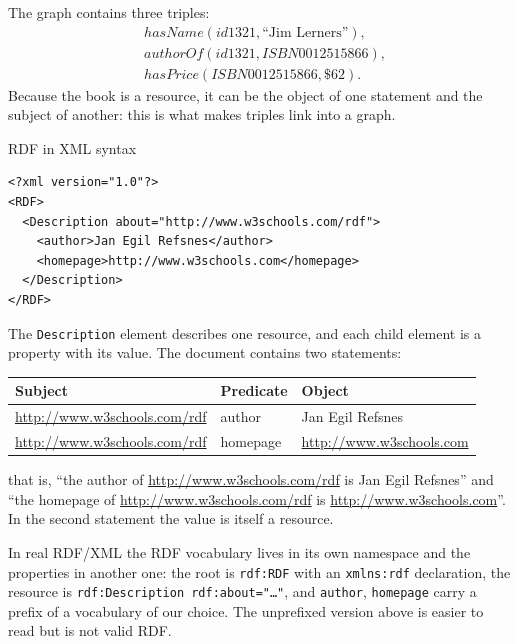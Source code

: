 The graph contains three triples:
\begin{align*}
  &\mathit{hasName}(\mathit{id1321}, \text{``Jim Lerners''}),\\
  &\mathit{authorOf}(\mathit{id1321}, \mathit{ISBN0012515866}),\\
  &\mathit{hasPrice}(\mathit{ISBN0012515866}, \text{\$62}).
\end{align*}
Because the book is a
resource, it can be the object of one statement and the subject of another: this is
what makes triples link into a graph.

\begin{nbexample}{RDF in XML syntax}
\begin{verbatim}
<?xml version="1.0"?>
<RDF>
  <Description about="http://www.w3schools.com/rdf">
    <author>Jan Egil Refsnes</author>
    <homepage>http://www.w3schools.com</homepage>
  </Description>
</RDF>
\end{verbatim}
The \texttt{Description} element describes one resource, and each child element is a
property with its value. The document contains two statements:
\begin{center}
\small
\begin{tabular}{@{}lll@{}}
\toprule
\textbf{Subject} & \textbf{Predicate} & \textbf{Object} \\
\midrule
\url{http://www.w3schools.com/rdf} & author   & Jan Egil Refsnes \\
\url{http://www.w3schools.com/rdf} & homepage & \url{http://www.w3schools.com} \\
\bottomrule
\end{tabular}
\end{center}
that is, ``the author of \url{http://www.w3schools.com/rdf} is Jan Egil Refsnes'' and
``the homepage of \url{http://www.w3schools.com/rdf} is
\url{http://www.w3schools.com}''. In the second statement the value is itself a
resource.
\end{nbexample}

\begin{nbwarning}
In real RDF/XML the RDF vocabulary lives in its own namespace and the properties in
another one: the root is \texttt{rdf:RDF} with an \texttt{xmlns:rdf} declaration, the
resource is \texttt{rdf:Description rdf:about="\ldots"}, and \texttt{author},
\texttt{homepage} carry a prefix of a vocabulary of our choice. The unprefixed version
above is easier to read but is not valid RDF.
\end{nbwarning}

